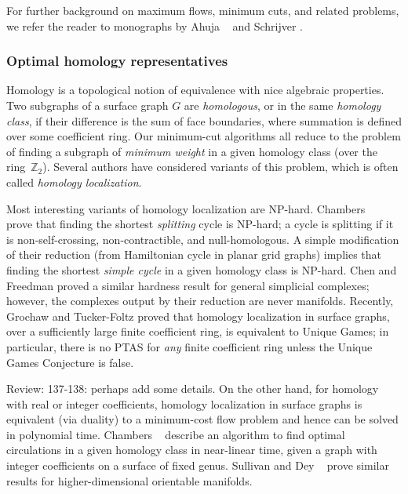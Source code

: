 \documentclass[letterpaper,review]{siamart190516}
\def\Z{\mathbb{Z}}
\def\rnote#1{\color{red}Review: #1 \color{black}}
\begin{document}
For further background on maximum flows, minimum cuts, and related problems, we refer the reader to monographs by Ahuja \etal\ \cite{amo-nftaa-93} and Schrijver \cite{s-cape-03}.

\subsubsection*{Optimal homology representatives}

Homology is a topological notion of equivalence with nice algebraic properties.  Two subgraphs of a surface graph $G$ are \emph{homologous}, or in the same \emph{homology class}, if their difference is the sum of face boundaries, where summation is defined over some coefficient ring.  Our minimum-cut algorithms all reduce to the problem of finding a subgraph of \emph{minimum weight} in a given homology class (over the ring~$\Z_2$).  Several  authors have considered variants of this problem, which is often called \emph{homology localization}.

Most interesting variants of homology localization are NP-hard.  Chambers \etal~\cite{ccelw-scsih-08} prove that finding the shortest \emph{splitting} cycle is {NP}-hard; a cycle is splitting if it is non-self-crossing, non-contractible, and null-homologous.  A simple modification of their reduction (from Hamiltonian cycle in planar grid graphs) implies that finding the shortest \emph{simple cycle} in a given homology class is {NP}-hard.  Chen and Freedman \cite{cf-qhc-08, cf-qhc2-07} proved a similar hardness result for general simplicial complexes; however, the complexes output by their reduction are never manifolds.  Recently, Grochaw and Tucker-Foltz \cite{gt-ctugc-18} proved that homology localization in surface graphs, over a sufficiently large finite coefficient ring, is equivalent to Unique Games; in particular, there is no PTAS for \emph{any} finite coefficient ring unless the Unique Games Conjecture is false.

\rnote{137-138: perhaps add some details. }
On the other hand, for homology with real or integer coefficients, homology localization in surface graphs is equivalent (via duality) to a minimum-cost flow problem and hence can be solved in polynomial time.  Chambers \etal~\cite{cen-hfcc-12} describe an algorithm to find optimal circulations in a given homology class in near-linear time, given a graph with integer coefficients on a surface of fixed genus.  Sullivan \cite{s-cath-90} and Dey \etal\ \cite{dhk-ohctu-11} prove similar results for higher-dimensional orientable manifolds.
\end{document}
